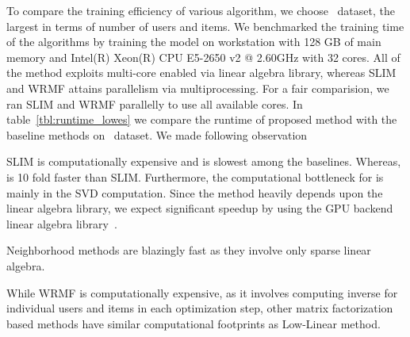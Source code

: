 
To compare the training efficiency of various algorithm, we choose \Lowes\ dataset, the largest in terms of number of users and items. 
We benchmarked the training time of the algorithms 
by training the model on  workstation with 128 GB of main memory and Intel(R) Xeon(R) CPU E5-2650 v2 @ 2.60GHz with 32 cores. All of the method exploits multi-core enabled via linear algebra library, whereas SLIM and WRMF attains parallelism via multiprocessing. For a fair comparision, we ran  SLIM and WRMF parallelly to use all available cores.  In table~\ref{tbl:runtime_lowes} we compare the runtime of proposed method with the baseline methods on \Lowes\ dataset. We  made following observation
\begin{compactitem}
\item  SLIM is computationally expensive and is slowest among the baselines. Whereas, \LinearLow is 10 fold faster than SLIM. Furthermore, the computational bottleneck for \LinearLow is mainly in the SVD computation. Since the method heavily depends upon the linear algebra library, we expect significant speedup by using the GPU backend linear algebra library~\citep{Voronin:GPURSVD}. 
\item Neighborhood methods are blazingly fast as they involve only sparse linear algebra.
\item While WRMF is computationally expensive, as it involves computing inverse for individual users and items in each optimization step, other matrix factorization based methods have similar computational footprints as Low-Linear method.
\end{compactitem}

\begin{table}
\caption{Training time on the  \Guitar\ Dataset.}
\label{tbl:runtime_lowes}
\centering
{}

\end{table}